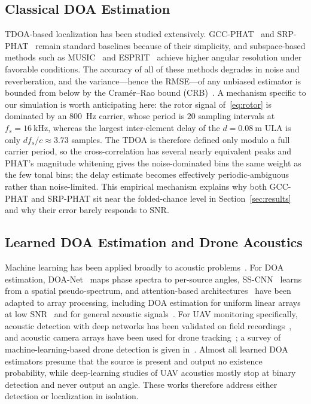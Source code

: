\documentclass[5p,twocolumn]{elsarticle}
\begin{document}
\subsection{Classical DOA Estimation}
TDOA-based localization has been studied extensively. GCC-PHAT~\cite{knapp1976gcc} and SRP-PHAT~\cite{dibiase2001srp} remain standard baselines because of their simplicity, and subspace-based methods such as MUSIC~\cite{schmidt1986music} and ESPRIT~\cite{roy1989esprit} achieve higher angular resolution under favorable conditions. The accuracy of all of these methods degrades in noise and reverberation, and the variance---hence the RMSE---of any unbiased estimator is bounded from below by the Cram\'er--Rao bound (CRB)~\cite{stoica1989music}. A mechanism specific to our simulation is worth anticipating here: the rotor signal of~\eqref{eq:rotor} is dominated by an \SI{800}{\hertz} carrier, whose period is $20$ sampling intervals at $f_s=\SI{16}{\kilo\hertz}$, whereas the largest inter-element delay of the $d=\SI{0.08}{\meter}$ ULA is only $df_s/c\approx3.73$ samples. The TDOA is therefore defined only modulo a full carrier period, so the cross-correlation has several nearly equivalent peaks and PHAT's magnitude whitening gives the noise-dominated bins the same weight as the few tonal bins; the delay estimate becomes effectively periodic-ambiguous rather than noise-limited. This empirical mechanism explains why both GCC-PHAT and SRP-PHAT sit near the folded-chance level in Section~\ref{sec:results} and why their error barely responds to SNR.

\subsection{Learned DOA Estimation and Drone Acoustics}
Machine learning has been applied broadly to acoustic problems~\cite{bianco2019ml}. For DOA estimation, DOA-Net~\cite{adavanne2018doa} maps phase spectra to per-source angles, SS-CNN~\cite{nguyen2020sscnn} learns from a spatial pseudo-spectrum, and attention-based architectures~\cite{vaswani2017attention} have been adapted to array processing, including DOA estimation for uniform linear arrays at low SNR~\cite{wang2024transformer} and for general acoustic signals~\cite{mack2022attention}. For UAV monitoring specifically, acoustic detection with deep networks has been validated on field recordings~\cite{jeon2017drone,kim2017uav}, and acoustic camera arrays have been used for drone tracking~\cite{busset2015acoustic}; a survey of machine-learning-based drone detection is given in~\cite{taha2019drone}. Almost all learned DOA estimators presume that the source is present and output no existence probability, while deep-learning studies of UAV acoustics mostly stop at binary detection and never output an angle. These works therefore address either detection or localization in isolation.
\end{document}
